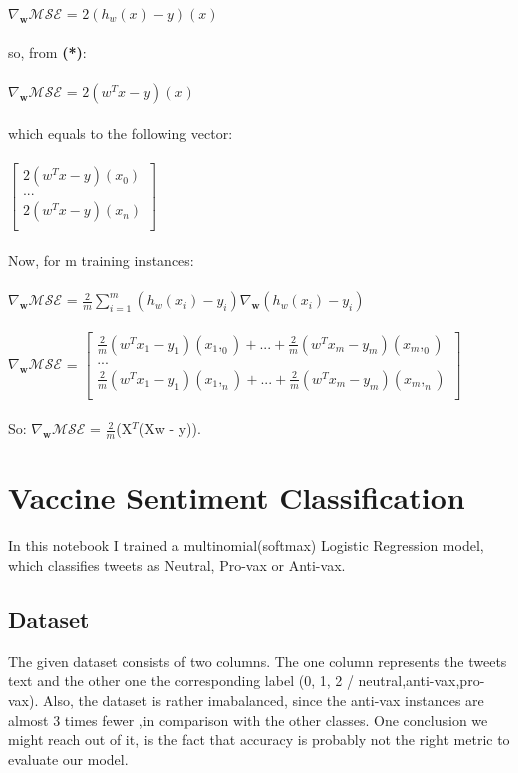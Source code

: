\documentclass{article}
\begin{document}
$\nabla_{\!\mathbf{w}}\mathcal{MSE} $ = $2(h_w(x) - y)$$(x)$ \\ \\ 
so, from \textbf{(*)}:\\ \\
$\nabla_{\!\mathbf{w}}\mathcal{MSE} $ = $2(w^Tx - y)$$(x)$   \\ \\ 
which equals to the following vector: \\ \\
$
\begin{bmatrix}
2(w^Tx - y)(x_0)\\
. . .\\             
2(w^Tx - y)(x_n)\\
\end{bmatrix}
$ \\ \\
Now, for m training instances: \\ \\ 
$\nabla_{\!\mathbf{w}}\mathcal{MSE} $ = $\frac{2}{m}\sum_{i=1}^{m}(h_w(x_i) - y_i)\nabla_{\!\mathbf{w}}$$(h_w(x_i) - y_i)$ \\ \\
$\nabla_{\!\mathbf{w}}\mathcal{MSE} $ = $\begin{bmatrix}
\frac{2}{m}(w^Tx_1 - y_1)(x_1,_0) + ... + \frac{2}{m}(w^Tx_m - y_m)(x_m,_0) \\
. . .\\             
\frac{2}{m}(w^Tx_1 - y_1)(x_1,_n) + ... + \frac{2}{m}(w^Tx_m - y_m)(x_m,_n)\\
\end{bmatrix}
$ \\ \\ 
So: $\nabla_{\!\mathbf{w}}\mathcal{MSE} $ = $\frac{2}{m}$(X$^T$(Xw - y)).
\section{Vaccine Sentiment Classification}
In this notebook I trained a multinomial(softmax) Logistic Regression model, which classifies tweets as Neutral, Pro-vax or Anti-vax.
\subsection{Dataset}
The given dataset consists of two columns. The one column represents the tweets text and the other one the corresponding label (0, 1, 2 / neutral,anti-vax,pro-vax). Also, the dataset is rather imabalanced, since the anti-vax instances are almost 3 times fewer ,in comparison with the other classes. One conclusion we might reach out of it, is the fact that accuracy is probably not the right metric to evaluate our model.
\end{document}
